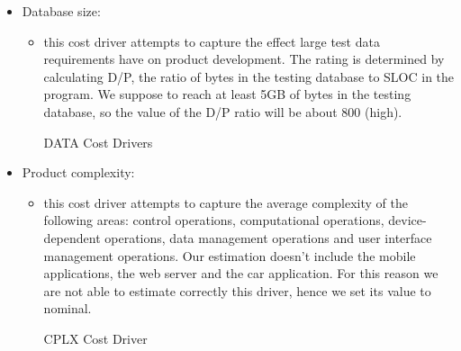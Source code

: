 \begin{itemize}
	\item Database size: 
	\begin{itemize}
		\item [] this cost driver attempts to capture the effect large test data requirements have on product development. The rating is determined by calculating D/P, the ratio of bytes in the testing database to SLOC in the program. We suppose to reach at least 5GB of bytes in the testing database, so the value of the D/P ratio will be about 800 (high).
\begin{costdriverstable}{DATA Cost Drivers}
	\hline
\end{costdriverstable}
	\end{itemize}
\end{itemize}

\begin{itemize}
	\item Product complexity: 
	\begin{itemize}
		\item [] this cost driver attempts to capture the average complexity of the following areas: control operations, computational operations, device-dependent operations, data management operations and user interface management operations. Our estimation doesn't include the mobile applications, the web server and the car application. For this reason we are not able to estimate correctly this driver, hence we set its value to nominal. 
\begin{costdriverstable}{CPLX Cost Driver}
\end{costdriverstable}
	\end{itemize}
\end{itemize}


